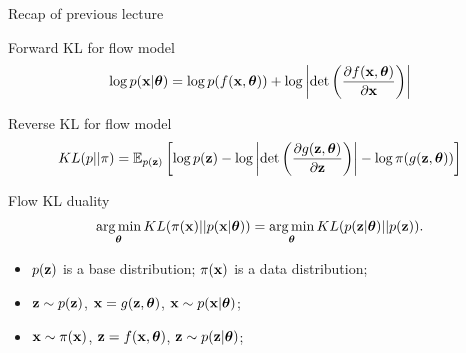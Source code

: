 \begin{frame}{Recap of previous lecture}
	\begin{block}{Forward KL for flow model}
	  	\vspace{-0.3cm}
		\[
			\log p(\mathbf{x}|\boldsymbol{\theta}) = \log p(f(\mathbf{x}, \boldsymbol{\theta})) + \log  \left|\det \left( \frac{\partial f(\mathbf{x}, \boldsymbol{\theta})}{\partial \mathbf{x}} \right) \right|
		\]
		\vspace{-0.3cm}
	\end{block}
	\begin{block}{Reverse KL for flow model}
  		\vspace{-0.5cm}
		\[
			KL(p || \pi)  = \mathbb{E}_{p(\mathbf{z})} \left[  \log p(\mathbf{z}) - \log \left|\det \left( \frac{\partial g(\mathbf{z}, \boldsymbol{\theta})}{\partial \mathbf{z}} \right) \right| - \log \pi(g(\mathbf{z}, \boldsymbol{\theta})) \right]
		\]
		\vspace{-0.5cm}
	\end{block}
	\begin{block}{Flow KL duality}
	  	\vspace{-0.3cm}
		\[
			\operatorname*{arg\,min}_{\boldsymbol{\theta}} KL(\pi(\mathbf{x}) || p(\mathbf{x} | \boldsymbol{\theta})) = \operatorname*{arg\,min}_{\boldsymbol{\theta}} KL(p(\mathbf{z} | \boldsymbol{\theta}) || p(\mathbf{z})).
		\]
		\vspace{-0.3cm}
		\begin{itemize}
			\item $p(\mathbf{z})$ is a base distribution; $\pi(\mathbf{x})$ is a data distribution;
			\item $\mathbf{z} \sim p(\mathbf{z})$, $\mathbf{x} = g(\mathbf{z}, \boldsymbol{\theta})$, $\mathbf{x} \sim p(\mathbf{x}| \boldsymbol{\theta})$;
			\item $\mathbf{x} \sim \pi(\mathbf{x})$, $\mathbf{z} = f(\mathbf{x}, \boldsymbol{\theta})$, $\mathbf{z} \sim p(\mathbf{z} | \boldsymbol{\theta})$;
		\end{itemize}
	\end{block}
\end{frame}
